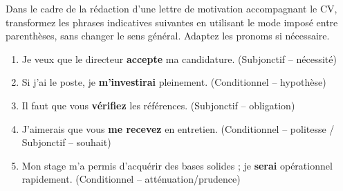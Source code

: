 \documentclass[11pt]{article}
\begin{document}
\begin{exercice}
Dans le cadre de la rédaction d'une lettre de motivation accompagnant le CV, transformez les phrases indicatives suivantes en utilisant le mode imposé entre parenthèses, sans changer le sens général. Adaptez les pronoms si nécessaire.\\

\begin{enumerate}
    \item Je veux que le directeur \textbf{accepte} ma candidature. (Subjonctif -- nécessité)
    \item Si j'ai le poste, je \textbf{m'investirai} pleinement. (Conditionnel -- hypothèse)
    \item Il faut que vous \textbf{vérifiez} les références. (Subjonctif -- obligation)
    \item J'aimerais que vous \textbf{me recevez} en entretien. (Conditionnel -- politesse / Subjonctif -- souhait)
    \item Mon stage m'a permis d'acquérir des bases solides ; je \textbf{serai} opérationnel rapidement. (Conditionnel -- atténuation/prudence)
\end{enumerate}
\end{exercice}
\end{document}
